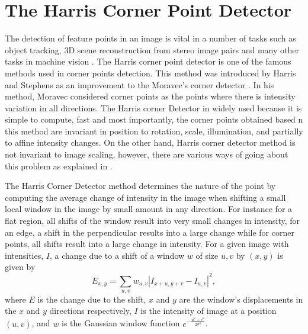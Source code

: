 \documentclass[10pt,a4paper]{article}
\begin{document}
      \section{The Harris Corner Point Detector}
      The detection of feature points in an image is vital in a number of tasks such as object tracking, $3$D scene reconstruction from stereo image pairs and many other tasks in machine vision \citep{trajkovic1998fast}.
      The Harris corner point detector is one of the famous methods used in corner points detection. This method was introduced by Harris and Stephens \citep{harris1988combined} as an improvement to the Moravec's corner detector \citep{moravec1979visual,moravec1980obstacle}. In his method, Moravec considered corner points as the points where there is intensity variation in all directions. The Harris corner Detector in widely used because it is simple to compute, fast and most importantly, the corner points obtained based n this method are invariant in position to rotation, scale, illumination, and partially to affine intensity changes. On the other hand, Harris corner detector method is not invariant to image scaling, however, there are various ways of going about this problem as explained in \citep{stoica2011delaunay}.
  
      The Harris Corner Detector method determines the nature of the point by computing the average change of intensity in the image when shifting a small local window in the image by small amount in any direction. For instance for a flat region, all shifts of the window result into very small changes in intensity, for an edge, a shift in the perpendicular results into a large change while for corner points, all shifts result into a large change in intensity. For a given image with intensities, $I$, a change due to a shift of a window $w$ of size $u,v$ by $(x,y)$ is given by
      \begin{equation}
      E_{x,y} = \sum_{u,v} w_{u,v} |I_{x+u, y+v} - I_{u,v}|^2,
      \end{equation}
      where $E$ is the change due to the shift, $x$ and $y$ are the window's displacements in the $x$ and $y$ directions respectively, $I$ is the intensity of image at a position $(u,v)$, and $w$ is the Gaussian window function  $e^{-\frac{u^2 + v^2}{2 \sigma^2}}$.
      
\end{document}

